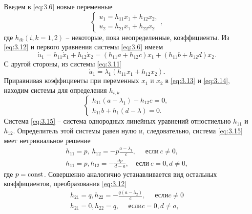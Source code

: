 Введем в \eqref{eq:3.6} новые переменные
\begin{equation}
        \label{eq:3.12
        }
        \begin{cases}
                u_1= h_{11} x_1 +h_{12} x_2,\\
                u_2=h_{21} x_1 +h_{22} x_2
        \end{cases}
        ,
\end{equation}
где $h_{ik} (i,k= 1,2)$ -- некоторые, пока неопределенные, коэффициенты. Из \eqref{eq:3.12} и первого уравнения системы \eqref{eq:3.6} имеем
\begin{equation}
        \label{eq:3.13}
        \dot u_1 = h_{11} \dot x_1 + h_{12} \dot x_2 = (h_{11} a + h_{12}c) x_1+ (h_{11} b+ h_{12} d) x_2.
\end{equation}
С другой стороны, из системы \eqref{eq:3.11}
\begin{equation}
        \label{eq:3.14}
        \dot u_1 = \lambda_1(h_{11} x_1 + h_{12} x_2).
\end{equation}
Приравнивая коэффициенты при переменных $x_1$ и $x_{2}$ в \eqref{eq:3.13} и \eqref{eq:3.14}, находим системы для определения $h_{i,k}$ 
\begin{equation}
        \label{eq:3.15}
        \begin{cases}
                h_{11}(a - \lambda_1) + h_{12} c=0,\\
                h_{11} b + h_1(d -\lambda) =0.
        \end{cases}
\end{equation}
Система \eqref{eq:3.15} -- система однородных линейных уравнений отностиельно $h_{11}$ и $h_{12}$. Определитель этой системы равен нулю и, следовательно, система \eqref{eq:3.15} меет нетривиальное решение
\begin{equation}
        \label{eq:3.16}
        \begin{gathered}
                h_{11} = p,~h_{12}= - p\frac{a-\lambda_1}{c}, \quad \text{ если}~ c \neq 0, \\
                h_{11}=p, h_{12} = -  \frac{dp}{d-a},\quad \text{если} ~ c=0, d\neq 0,
        \end{gathered}
\end{equation}
где $p= \textrm{const}$. Совершенно аналогично устанавливается вид остальных коэффициентов, преобразования \eqref{eq:3.12}
\begin{equation}
        \label{eq:3.17}
        \begin{gathered}
                h_{21}=q , h_{22} = - \frac{q (a- \lambda_2)}{c}, \quad \text{ если} c\neq 0 \\
                h_{21}=0, h_{22}= q, \quad \text{ если} c=0, d\neq a,
        \end{gathered}
\end{equation}
